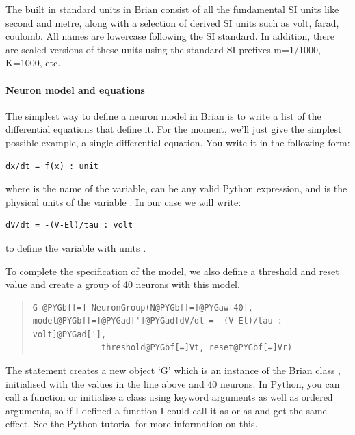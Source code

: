 \documentclass[letterpaper,10pt,english]{manual}
\begin{document}
The built in standard units in Brian consist of all the fundamental
SI units like second and metre, along with a selection of derived
SI units such as volt, farad, coulomb. All names are lowercase
following the SI standard. In addition, there are scaled versions
of these units using the standard SI prefixes m=1/1000, K=1000, etc.


\paragraph{Neuron model and equations}

The simplest way to define a neuron model in Brian is to write a list
of the differential equations that define it. For the moment, we'll just
give the simplest possible example, a single differential equation. You
write it in the following form:

\begin{Verbatim}[commandchars=@\[\]]
dx/dt = f(x) : unit
\end{Verbatim}

where  is the name of the variable,  can be any valid Python
expression, and  is the physical units of the variable . In our
case we will write:

\begin{Verbatim}[commandchars=@\[\]]
dV/dt = -(V-El)/tau : volt
\end{Verbatim}

to define the variable  with units .

To complete the specification of the model, we also define a threshold and reset
value and create a group of 40 neurons with this model.
\begin{quote}

\begin{Verbatim}[commandchars=@\[\]]
G @PYGbf[=] NeuronGroup(N@PYGbf[=]@PYGaw[40], model@PYGbf[=]@PYGad[']@PYGad[dV/dt = -(V-El)/tau : volt]@PYGad['],
              threshold@PYGbf[=]Vt, reset@PYGbf[=]Vr)
\end{Verbatim}
\end{quote}

The statement creates a new object `G' which is an instance of the
Brian class \hyperlink{brian.NeuronGroup}{}, initialised with the values in the
line above and 40 neurons. In Python, you can call a function or initialise
a class using keyword arguments as well as ordered arguments, so
if I defined a function  I could call it as  or
as  and get the same effect. See the Python tutorial
for more information on this.
\end{document}
